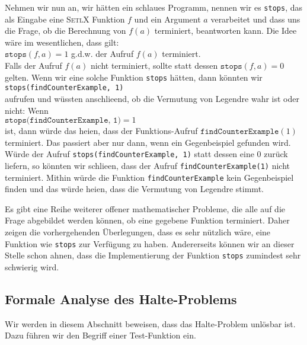 Nehmen wir nun an, wir h\"{a}tten ein schlaues Programm, nennen wir es \texttt{stops}, das als Eingabe
eine \textsc{SetlX} Funktion $f$ und ein Argument $a$ verarbeitet und dass uns die Frage, ob die Berechnung von $f(a)$
terminiert, beantworten kann.  Die Idee w\"{a}re im wesentlichen, dass gilt:
\\[0.2cm]
\hspace*{1.3cm}
$\texttt{stops}(f, a) = 1$ \quad g.d.w. \quad der Aufruf $f(a)$ terminiert.
\\[0.2cm]
Falls der Aufruf $f(a)$ nicht terminiert,  sollte statt dessen $\texttt{stops}(f,a) = 0$ gelten.
Wenn wir eine solche Funktion \texttt{stops} h\"{a}tten, dann k\"{o}nnten wir 
\\[0.2cm]
\hspace*{1.3cm}
\texttt{stops(findCounterExample, 1)}
\\[0.2cm]
aufrufen und w\"{u}ssten anschlie\3end, ob die Vermutung von Legendre wahr ist oder nicht:  Wenn
\\[0.2cm]
\hspace*{1.3cm}
$\texttt{stops(findCounterExample, 1)} = 1$
 \\[0.2cm]
ist, dann w\"{u}rde das hei\3en,
dass der Funktions-Aufruf $\texttt{findCounterExample}(1)$ terminiert.  Das passiert aber nur dann,
wenn ein Gegenbeispiel gefunden wird.  W\"{u}rde der Aufruf \texttt{stops(findCounterExample, 1)}
statt dessen eine $0$ zur\"{u}ck liefern, so k\"{o}nnten wir schlie\3en, dass der Aufruf \texttt{findCounterExample(1)}
nicht terminiert. Mithin w\"{u}rde die Funktion \texttt{findCounterExample} kein Gegenbeispiel finden und
das w\"{u}rde hei\3en, dass die Vermutung von Legendre stimmt.

Es gibt eine Reihe weiterer offener  mathematischer Probleme, die alle auf die Frage abgebildet
werden k\"{o}nnen, ob eine gegebene Funktion terminiert.  Daher zeigen die vorhergehenden \"{U}berlegungen,
dass es sehr n\"{u}tzlich w\"{a}re, eine Funktion wie \texttt{stops} zur Verf\"{u}gung zu haben.  Andererseits
k\"{o}nnen wir an dieser Stelle schon ahnen, dass die Implementierung der Funktion \texttt{stops}
zumindest sehr schwierig wird.  

 
\subsection{Formale Analyse des Halte-Problems}
Wir werden in diesem Abschnitt beweisen, dass das Halte-Problem unl\"{o}sbar ist.  Dazu f\"{u}hren
wir den Begriff einer Test-Funktion ein.  

